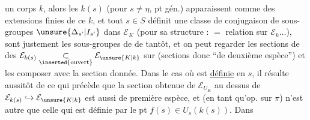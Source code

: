 un corps $k$, alors les $k(s)$ (pour $s\ne\eta$, pt gén.) apparaissent comme des extensions finies de ce $k$, et tout $s\in S$ définit une classe de conjugaison de sous-groupes $\unsure{\Delta_{s'}|I_{s'}}$ dans $\mathcal E_K$ (pour sa structure :  $=$  relation sur $\mathcal E_k\ldots$),   sont justement les sous-groupes  de   de tantôt, et on peut regarder les sections de   des $\mathcal E_{k(s)}\underset{\inserted{\text{ouvert}}}{\subset}\mathcal E_{\unsure{K|k}}$ sur (sections donc ``de deuxième espèce'') et les composer avec la section donnée. Dans le cas où   est \uline{définie} en $s$, il résulte aussitôt de ce qui précède que la section  obtenue de $\mathcal E_{U_K}$ au dessus de $\mathcal E_{k(s)}\hookrightarrow\mathcal E_{\unsure{K|k}}$ est aussi de première espèce, et  (en tant qu'op.   sur $\pi$)  n'est autre que celle qui est définie par le pt $f(s)\in U_s(k(s))$. Dans
